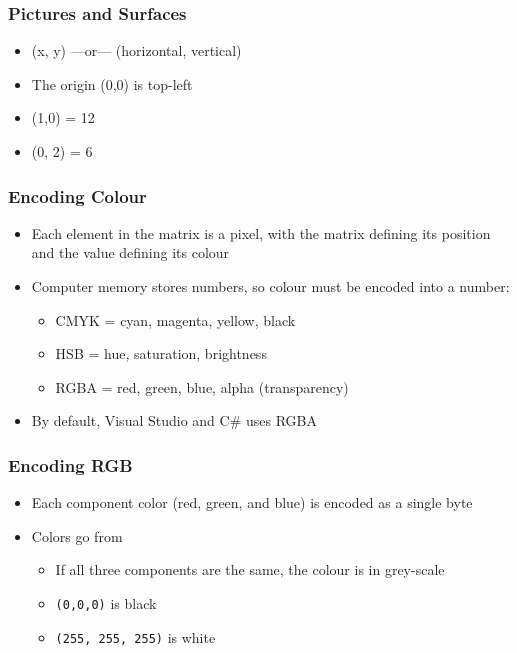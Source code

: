 

\begin{frame}
	\frametitle{Pictures and Surfaces}
	
	\begin{itemize}
		\item (x, y) ---or--- (horizontal, vertical)
		\item The origin (0,0) is top-left
		\item (1,0) = 12
		\item (0, 2) = 6
	\end{itemize}
\end{frame}

\begin{frame}
	\frametitle{Encoding Colour}
	
	\begin{itemize}
		\item Each element in the matrix is a pixel, with the matrix defining its position and the value defining  its colour
		\item Computer memory stores numbers, so colour must be encoded into a number:
		\begin{itemize}
			\item CMYK = cyan, magenta, yellow, black
			\item HSB = hue, saturation, brightness
			\item RGBA = red, green, blue, alpha (transparency)
		\end{itemize}
		\item By default, Visual Studio and C\# uses RGBA
	\end{itemize}
\end{frame}

\begin{frame}[fragile]
	\frametitle{Encoding RGB}
	
	\begin{itemize}
		\item Each component color (red, green, and blue) is encoded as a single byte
		\item Colors go from %
		\begin{itemize}
			\item If all three components are the same, the colour is in grey-scale
			\item  \lstinline{(0,0,0)} is black
			\item  \lstinline{(255, 255, 255)} is white
		\end{itemize}
	\end{itemize}
\end{frame}



